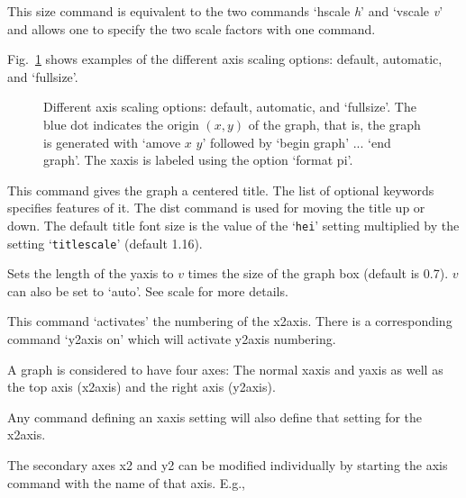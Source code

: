 \begin{commanddescription}
This {\sf size} command is equivalent to the two commands `{\sf hscale {\it h}}' and `{\sf vscale {\it v}}' and allows one to specify the two scale factors with one command.

Fig.~\ref{grscale:fig} shows examples of the different axis scaling options: default, automatic, and `{\sf fullsize}'.

\begin{figure}[tb]
\centering
\mbox{}
\caption{\label{grscale:fig}Different axis scaling options: default, automatic, and `{\sf fullsize}'. The blue dot indicates the origin $(x,y)$ of the graph, that is, the graph is generated with `{\sf amove $x$ $y$}' followed by `{\sf begin graph}' ... `{\sf end graph}'. The xaxis is labeled using the option `{\sf format pi}'.}
\end{figure}

\item[{\sf title {\it "title"}  [hei {\it ch-hei}] [color {\it col}] [font {\it font}] [dist {\it cm}]  }   ]
This command gives the graph a centered title.  The list of optional keywords specifies features of it.  The {\sf dist} command is used for moving the title up or down. The default title font size is the value of the `\texttt{hei}' setting multiplied by the setting `\texttt{titlescale}' (default 1.16).

\item[{\sf vscale v}]
Sets the length of the yaxis to $v$ times the size of the graph box (default is 0.7). $v$ can also be set to `{\sf auto}'. See {\sf scale} for more details.

\item[{\sf x2labels on}]
This command `activates' the numbering of the x2axis.  There is a
corresponding command `{\sf y2axis on}' which will activate y2axis numbering.

\item[{\sf xaxis | yaxis | x2axis | y2axis}]
A graph is considered to have four axes:  The normal xaxis and
yaxis as well as the top axis (x2axis) and the right axis (y2axis).

Any command defining an xaxis setting will also define that setting
for the x2axis.

The secondary axes x2 and y2 can be modified individually by starting the
axis command with the name of that axis. E.g.,


\end{commanddescription}
